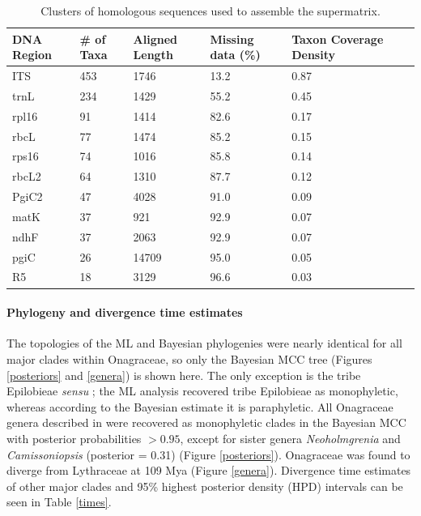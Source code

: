 \documentclass[review]{elsarticle}
\begin{document}
\begin{table}
   \center
   \begin{adjustbox}{max width=\textwidth}
      \begin{tabular}{lllllll}
         \toprule
         DNA Region & \# of Taxa & Aligned Length & Missing data (\%) & Taxon Coverage Density \\ 
	 \midrule
         ITS & 453 & 1746 & 13.2 & 0.87 \\
         trnL & 234 & 1429 & 55.2 & 0.45 \\
         rpl16 & 91 & 1414 & 82.6 & 0.17 \\
         rbcL & 77 & 1474 & 85.2 & 0.15 \\
         rps16 & 74 & 1016 & 85.8 & 0.14 \\
         rbcL2 & 64 & 1310 & 87.7 & 0.12 \\
         PgiC2 & 47 & 4028 & 91.0 & 0.09 \\
         matK & 37 & 921 & 92.9 & 0.07 \\
         ndhF & 37 & 2063 & 92.9 & 0.07 \\
         pgiC & 26 & 14709 & 95.0 & 0.05 \\
         R5 & 18 & 3129 & 96.6 & 0.03 \\
         \bottomrule
      \end{tabular}
   \end{adjustbox}
   \caption{Clusters of homologous sequences used to assemble the supermatrix.}
   \label{clusters}
\end{table}

\paragraph{Phylogeny and divergence time estimates}
The topologies of the ML and Bayesian phylogenies were nearly identical for all major clades within Onagraceae, 
so only the Bayesian MCC tree (Figures \ref{posteriors} and \ref{genera}) is shown here.
The only exception is the tribe Epilobieae \textit{sensu} \citet{wagner2007revised}; 
the ML analysis recovered tribe Epilobieae as monophyletic, 
whereas according to the Bayesian estimate it is paraphyletic.
All Onagraceae genera described in \citet{wagner2007revised} were recovered as monophyletic clades 
in the Bayesian MCC with posterior probabilities $> 0.95$,
except for sister genera \textit{Neoholmgrenia} and \textit{Camissoniopsis} (posterior = 0.31) (Figure \ref{posteriors}).
Onagraceae was found to diverge from Lythraceae at 109 Mya (Figure \ref{genera}). 
Divergence time estimates of other major clades and 95\% highest posterior density (HPD) intervals can be seen in Table \ref{times}.
\end{document}
